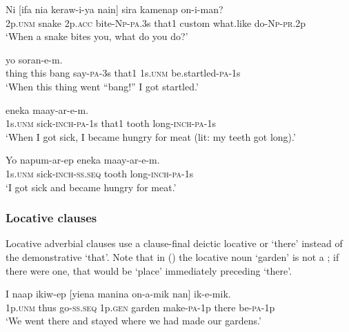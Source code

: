 \ea%
\label{ex:x1540}
\gll Ni  [ifa  nia  keraw-i-ya  nain]  sira  kamenap on-i-man?\\
2p.\textsc{unm} snake 2p.\textsc{acc} bite-\textsc{Np}-\textsc{pa}.3s  that1 custom  what.like do-\textsc{Np}-\textsc{pr}.2p\\
\glt`When a snake bites you, what do you do?'
\z


\ea%
\label{ex:x1569}
  yo  soran-e-m.\\
thing  this  bang  say-\textsc{pa}-3s  that1  1s.\textsc{unm}  be.startled-\textsc{pa}-1s\\
\glt`When this thing went ``bang!'' I got startled.'
\z


\ea%
\label{ex:x1624}
  eneka  maay-ar-e-m. \\
1s.\textsc{unm} sick-\textsc{inch}-\textsc{pa}-1s that1 tooth long-\textsc{inch}-\textsc{pa}-1s\\
\glt`When I got sick, I became hungry for meat (lit: my teeth got long).'
\z


\ea%
\label{ex:x1632}
\gll Yo  napum-ar-ep  eneka  maay-ar-e-m.\\
1s.\textsc{unm} sick-\textsc{inch}-\textsc{ss}.\textsc{seq} tooth  long-\textsc{inch}-\textsc{pa}-1s\\
\glt`I got sick and became hungry for meat.'
\z


\subsubsection[Locative clauses]{Locative clauses}

Locative adverbial clauses use a clause-final deictic locative  or  `there' instead of the demonstrative   `that'. Note that in () the locative noun  `garden' is not a ; if there were one, that would be  `place' immediately preceding  `there'. 

\ea%
\label{ex:x1621}
\gll I  naap  ikiw-ep  [yiena  manina  on-a-mik  nan] ik-e-mik.\\
1p.\textsc{unm} thus  go-\textsc{ss}.\textsc{seq} 1p.\textsc{gen} garden  make-\textsc{pa}-1p  there be-\textsc{pa}-1p\\
\glt`We went there and stayed where we had made our gardens.'
\z


